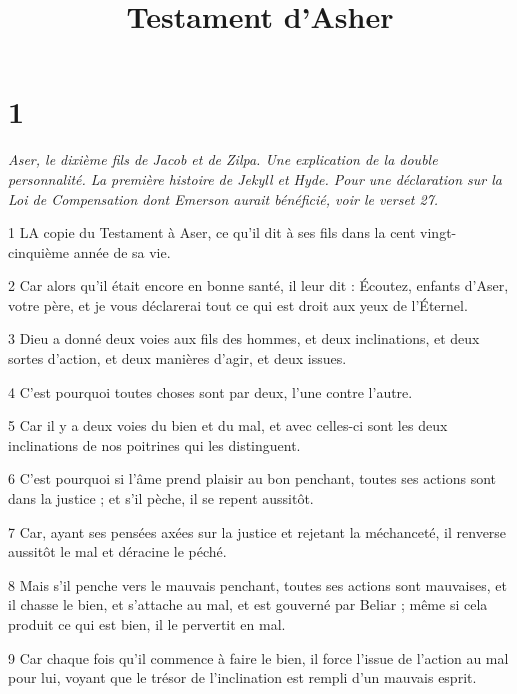 

\title{Testament d'Asher}

\chapter{1}

\par \textit{Aser, le dixième fils de Jacob et de Zilpa. Une explication de la double personnalité. La première histoire de Jekyll et Hyde. Pour une déclaration sur la Loi de Compensation dont Emerson aurait bénéficié, voir le verset 27.}

\par 1 LA copie du Testament à Aser, ce qu'il dit à ses fils dans la cent vingt-cinquième année de sa vie.

\par 2 Car alors qu'il était encore en bonne santé, il leur dit : Écoutez, enfants d'Aser, votre père, et je vous déclarerai tout ce qui est droit aux yeux de l'Éternel.

\par 3 Dieu a donné deux voies aux fils des hommes, et deux inclinations, et deux sortes d'action, et deux manières d'agir, et deux issues.

\par 4 C'est pourquoi toutes choses sont par deux, l'une contre l'autre.

\par 5 Car il y a deux voies du bien et du mal, et avec celles-ci sont les deux inclinations de nos poitrines qui les distinguent.

\par 6 C'est pourquoi si l'âme prend plaisir au bon penchant, toutes ses actions sont dans la justice ; et s'il pèche, il se repent aussitôt.

\par 7 Car, ayant ses pensées axées sur la justice et rejetant la méchanceté, il renverse aussitôt le mal et déracine le péché.

\par 8 Mais s'il penche vers le mauvais penchant, toutes ses actions sont mauvaises, et il chasse le bien, et s'attache au mal, et est gouverné par Beliar ; même si cela produit ce qui est bien, il le pervertit en mal.

\par 9 Car chaque fois qu'il commence à faire le bien, il force l'issue de l'action au mal pour lui, voyant que le trésor de l'inclination est rempli d'un mauvais esprit.


